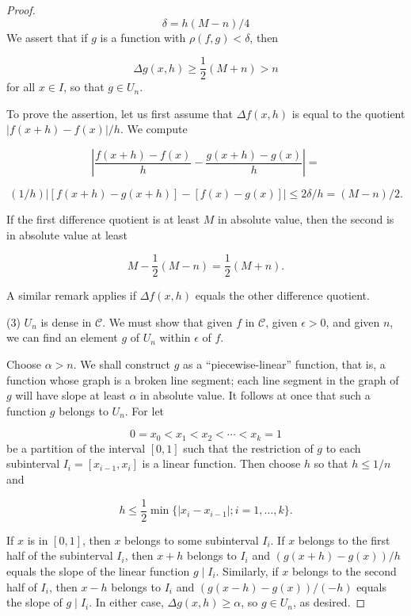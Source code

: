 \begin{proof}
\[
\delta = h({M - n}) /4
\]
We assert that if \(g\) is a function with \(\rho ({f,g}) < \delta\), then

\[
{\Delta g}({x,h}) \geq \frac{1}{2}({M + n}) > n
\]
for all \(x \in I\), so that \(g \in {U}_{n}\).

To prove the assertion, let us first assume that \({\Delta f}({x,h})\) is equal to the quotient \(| {f({x + h}) - f(x) }| /h\). We compute

\[
| {\frac{f({x + h}) - f(x) }{h} - \frac{g({x + h}) - g(x) }{h}}| =
\]

\[
({1/h}) | {[ {f({x + h}) - g({x + h}) }] - [ {f(x) - g(x) }] }| \leq {2\delta }/h = ({M - n}) /2.
\]

If the first difference quotient is at least \(M\) in absolute value, then the second is in absolute value at least

\[
M - \frac{1}{2}({M - n}) = \frac{1}{2}({M + n}).
\]

A similar remark applies if \({\Delta f}({x,h})\) equals the other difference quotient.

(3) \(U_{n}\) is dense in \(\mathcal{C}\). We must show that given \(f\) in \(\mathcal{C}\), given \(\epsilon > 0\), and given \(n\), we can find an element \(g\) of \(U_{n}\) within \(\epsilon\) of \(f\).

Choose \(\alpha > n\). We shall construct \(g\) as a ``piecewise-linear'' function, that is, a function whose graph is a broken line segment; each line segment in the graph of \(g\) will have slope at least \(\alpha\) in absolute value. It follows at once that such a function \(g\) belongs to \(U_{n}\). For let

\[
0 = x_{0} < x_{1} < x_{2} < \cdots < x_{k} = 1
\]
be a partition of the interval \([ {0,1}]\) such that the restriction of \(g\) to each subinterval \(I_{i} = [ {x_{i - 1},x_{i}}]\) is a linear function. Then choose \(h\) so that \(h \leq 1/n\) and

\[
h \leq \frac{1}{2}\min \{ {| {x_{i} - x_{i - 1}}| ;i = 1,\ldots, k}\}.
\]

If \(x\) is in \([ {0,1}]\), then \(x\) belongs to some subinterval \(I_{i}\). If \(x\) belongs to the first half of the subinterval \(I_{i}\), then \(x + h\) belongs to \(I_{i}\) and \(({g({x + h}) - g(x) }) /h\) equals the slope of the linear function \(g \mid {I}_{i}\). Similarly, if \(x\) belongs to the second half of \(I_{i}\), then \(x - h\) belongs to \(I_{i}\) and \(({g({x - h}) - g(x) }) /({-h})\) equals the slope of \(g \mid {I}_{i}\). In either case, \({\Delta g}({x,h}) \geq \alpha\), so \(g \in {U}_{n}\), as desired.


\end{proof}
